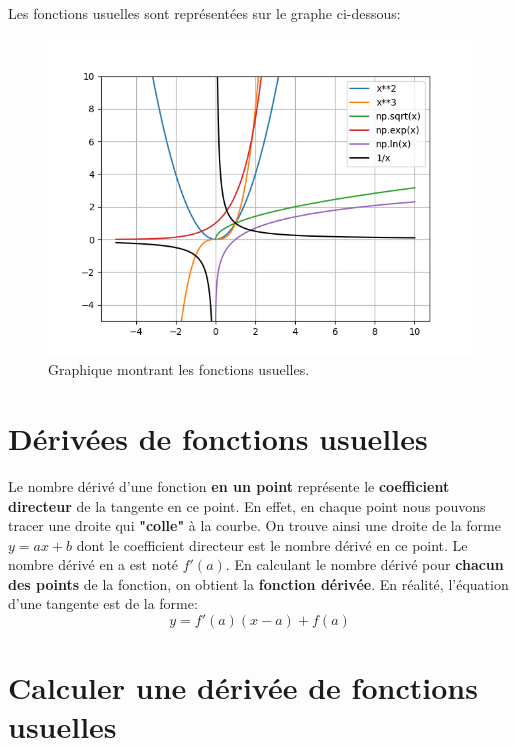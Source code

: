 \documentclass[12pt,a4paper,openany]{book}
\begin{document}
Les fonctions usuelles sont représentées sur le graphe ci-dessous:
\begin{figure}[!h]
\begin{center}
\includegraphics[scale=0.8]{Images/grapheFonctionsRemarquables.png} 
\caption{Graphique montrant les fonctions usuelles.}
\label{grapheFonctionsUsuelles}
\end{center}
\end{figure}

\section{Dérivées de fonctions usuelles}

Le nombre dérivé d'une fonction \textbf{en un point} représente le \textbf{coefficient directeur} de la tangente en ce point. En effet, en chaque point nous pouvons tracer une droite qui \textbf{"colle"} à la courbe. On trouve ainsi une droite de la forme \textbf{$ y = ax + b $} dont le coefficient directeur est le nombre dérivé en ce point. Le nombre dérivé en a est noté \textbf{$ f'(a) $}. En calculant le nombre dérivé pour \textbf{chacun des points} de la fonction, on obtient la \textbf{fonction dérivée}. En réalité, l'équation d'une tangente est de la forme:
\begin{equation}
y = f'(a)(x - a) + f(a)
\end{equation}

\section{Calculer une dérivée de fonctions usuelles}
\end{document}
